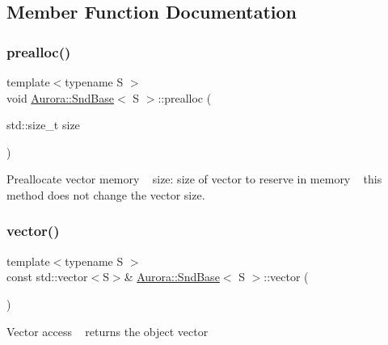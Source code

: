 \subsection{Member Function Documentation}
\mbox{\label{class_aurora_1_1_snd_base_a5d57c3b735e5d583b4b4ae5f8e9cdf4c}} 
\subsubsection{\texorpdfstring{prealloc()}{prealloc()}}
{\footnotesize\ttfamily template$<$typename S $>$ \\
void \hyperlink{class_aurora_1_1_snd_base}{Aurora\+::\+Snd\+Base}$<$ S $>$\+::prealloc (\begin{DoxyParamCaption}\item[{std\+::size\+\_\+t}]{size }\end{DoxyParamCaption})\hspace{0.3cm}{\ttfamily [inline]}}

Preallocate vector memory ~\newline
size\+: size of vector to reserve in memory ~\newline
this method does not change the vector size. \mbox{\label{class_aurora_1_1_snd_base_aecf7b916b5b459b5ac2855997fd2aec6}} 
\subsubsection{\texorpdfstring{vector()}{vector()}}
{\footnotesize\ttfamily template$<$typename S $>$ \\
const std\+::vector$<$S$>$\& \hyperlink{class_aurora_1_1_snd_base}{Aurora\+::\+Snd\+Base}$<$ S $>$\+::vector (\begin{DoxyParamCaption}{ }\end{DoxyParamCaption})\hspace{0.3cm}{\ttfamily [inline]}}

Vector access ~\newline
returns the object vector \mbox{\label{class_aurora_1_1_snd_base_ad68387541cc3d696d0cf58d474f94b73}} 
